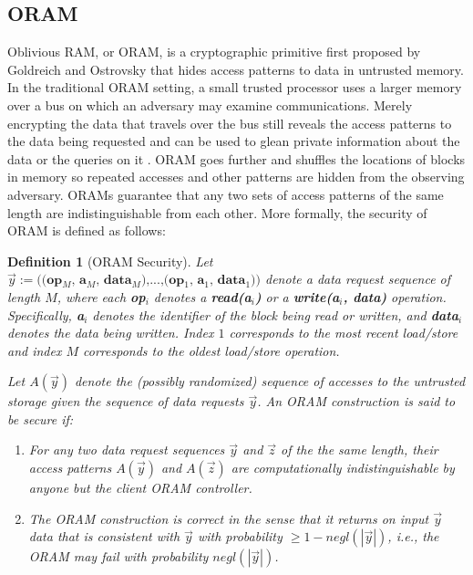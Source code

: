 \documentclass[conference]{IEEEtran}
\newtheorem{definition}[theorem]{Definition}
\begin{document}
\subsection{ORAM}
Oblivious RAM, or ORAM, is a cryptographic primitive first proposed by Goldreich and Ostrovsky \cite{GO96} that hides access patterns to data in untrusted memory. In the traditional ORAM setting, a small trusted processor uses a larger memory over a bus on which an adversary may examine communications. Merely encrypting the data that travels over the bus still reveals the access patterns to the data being requested and can be used to glean private information about the data or the queries on it \cite{IKK12}. ORAM goes further and shuffles the locations of blocks in memory so repeated accesses and other patterns are hidden from the observing adversary. ORAMs guarantee that any two sets of access patterns of the same length are indistinguishable from each other. More formally, the security of ORAM is defined as follows:
\begin{definition}[ORAM Security\cite{SDS+13}]
Let $\overrightarrow{y}:=\textbf{((op$_M$, a$_M$, data$_M$),...,(op$_1$, a$_1$, data$_1$))}$ denote a data request sequence of length $M$, where each \textbf{op$_i$} denotes a \textbf{read(a$_i$)} or a \textbf{write(a$_i$, data)} operation. Specifically, \textbf{a$_i$} denotes the identifier of the block being read or written, and \textbf{data$_i$} denotes the data being written. Index $1$ corresponds to the most recent load/store and index $M$ corresponds to the oldest load/store operation. 

Let $A(\overrightarrow{y})$ denote the (possibly randomized) sequence of accesses to the untrusted storage given the sequence of data requests $\overrightarrow{y}$. An ORAM construction is said to be secure if:
\begin{enumerate}
\item For any two data request sequences $\overrightarrow{y}$ and $\overrightarrow{z}$ of the the same length, their access patterns $A(\overrightarrow{y})$ and $A(\overrightarrow{z})$ are computationally indistinguishable by anyone but the client ORAM controller.

\item The ORAM construction is correct in the sense that it returns on input $\overrightarrow{y}$ data that is consistent with $\overrightarrow{y}$ with probability $\geq 1 - \textit{negl}(|\overrightarrow{y}|)$, i.e., the ORAM may fail with probability $\textit{negl}(|\overrightarrow{y}|)$.
\end{enumerate}
\end{definition}
\end{document}
